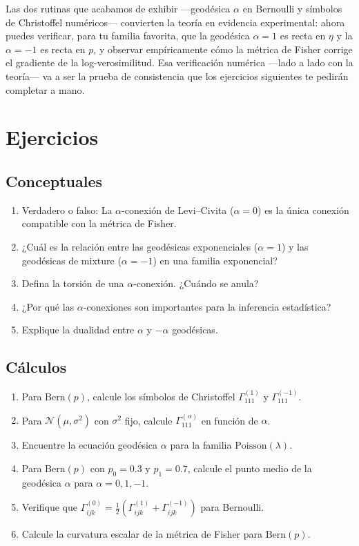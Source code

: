 \bigskip
\noindent
Las dos rutinas que acabamos de exhibir ---geodésica $\alpha$ en Bernoulli y símbolos de Christoffel numéricos--- convierten la teoría en evidencia experimental: ahora puedes verificar, para tu familia favorita, que la geodésica $\alpha=1$ es recta en $\eta$ y la $\alpha=-1$ es recta en $p$, y observar empíricamente cómo la métrica de Fisher corrige el gradiente de la log-verosimilitud. Esa verificación numérica ---lado a lado con la teoría--- va a ser la prueba de consistencia que los ejercicios siguientes te pedirán completar a mano.

\section{Ejercicios}

\subsection*{Conceptuales}
\begin{enumerate}
	\item[$\star$] Verdadero o falso: La $\alpha$-conexión de Levi--Civita ($\alpha = 0$) es la única conexión compatible con la métrica de Fisher.
	\item[$\star$] ¿Cuál es la relación entre las geodésicas exponenciales ($\alpha = 1$) y las geodésicas de mixture ($\alpha = -1$) en una familia exponencial?
	\item[$\star$] Defina la torsión de una $\alpha$-conexión.  ¿Cuándo se anula?
	\item[$\star$] ¿Por qué las $\alpha$-conexiones son importantes para la inferencia estadística?
	\item[$\star$] Explique la dualidad entre $\alpha$ y $-\alpha$ geodésicas.
\end{enumerate}

\subsection*{Cálculos}
\begin{enumerate}[resume]
	\item[$\star\star$] Para $\mathrm{Bern}(p)$, calcule los símbolos de Christoffel $\Gamma^{(1)}_{111}$ y $\Gamma^{(-1)}_{111}$.
	\item[$\star\star$] Para $\mathcal{N}(\mu, \sigma^2)$ con $\sigma^2$ fijo, calcule $\Gamma^{(\alpha)}_{111}$ en función de $\alpha$.
	\item[$\star\star$] Encuentre la ecuación geodésica $\alpha$ para la familia $\mathrm{Poisson}(\lambda)$.
	\item[$\star\star$] Para $\mathrm{Bern}(p)$ con $p_0 = 0.3$ y $p_1 = 0.7$, calcule el punto medio de la geodésica $\alpha$ para $\alpha = 0, 1, -1$.
	\item[$\star\star$] Verifique que $\Gamma^{(0)}_{ijk} = \frac{1}{2}(\Gamma^{(1)}_{ijk} + \Gamma^{(-1)}_{ijk})$ para Bernoulli.
	\item[$\star\star$] Calcule la curvatura escalar de la métrica de Fisher para $\mathrm{Bern}(p)$.
\end{enumerate}

